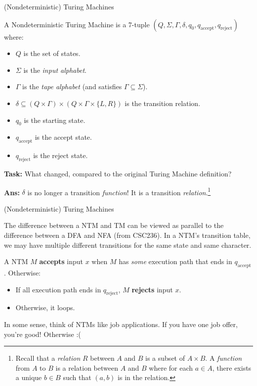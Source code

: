 \documentclass{beamer}
\begin{document}
\begin{frame}{(Nondeterministic) Turing Machines}

A Nondeterministic Turing Machine is a 7-tuple $(Q, \Sigma, \Gamma, \delta, q_0, q_{\text{accept}}, q_{\text{reject}})$ where:
\begin{itemize}
    \item $Q$ is the set of states.
    \item $\Sigma$ is the \textit{input alphabet}.
    \item $\Gamma$ is the \textit{tape alphabet} (and satisfies $\Gamma \subseteq \Sigma$).
    \item $\delta \subseteq (Q \times \Gamma) \times (Q \times \Gamma \times \{L, R\})$ is the transition relation.
    \item $q_0$ is the starting state.
    \item $q_{\text{accept}}$ is the accept state.
    \item $q_{\text{reject}}$ is the reject state.
\end{itemize}

\textbf{Task:} What changed, compared to the original Turing Machine definition?
\pause

\textbf{Ans:} $\delta$ is no longer a transition \textit{function}! It is a transition \textit{relation}.\footnote{Recall that a \textit{relation} $R$ between $A$ and $B$ is a subset of $A \times B$. A \textit{function} from $A$ to $B$ is a relation between $A$ and $B$ where for each $a \in A$, there exists a unique $b \in B$ such that $(a, b)$ is in the relation.
}
\end{frame}

\begin{frame}{(Nondeterministic) Turing Machines}

The difference between a NTM and TM can be viewed as parallel to the difference between a DFA and NFA (from CSC236). In a NTM's transition table, we may have multiple different transitions for the same state and same character. 

\pause
\vspace{2mm}

A NTM $M$ \textbf{accepts} input $x$ when $M$ has \textit{some} execution path that ends in $q_{\text{accept}}$. Otherwise:
\begin{itemize}
    \item If all execution path ends in $q_{\text{reject}}$, $M$ \textbf{rejects} input $x$.
    \item Otherwise, it loops.
\end{itemize}

\pause

In some sense, think of NTMs like job applications. If you have one job offer, you're good! Otherwise :(

\end{frame}
\end{document}
